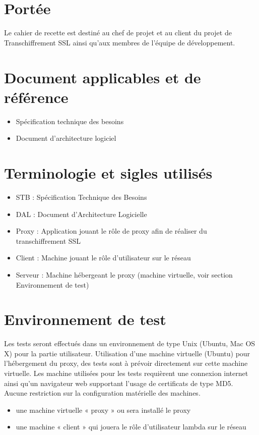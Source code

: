 \documentclass[a4paper,11pt,french]{article}
\begin{document}
\section{Portée}
Le cahier de recette est destiné au chef de projet et au client du projet de
Transchiffrement SSL ainsi qu’aux membres de l’équipe de développement.


\section{Document applicables et de référence}

\begin{itemize}
  \item Spécification technique des besoins
  \item Document d'architecture logiciel
\end{itemize}

\section{Terminologie et sigles utilisés}

\begin{itemize}
  \item STB : Spécification Technique des Besoins
  \item DAL : Document d’Architecture Logicielle
  \item Proxy : Application jouant le rôle de proxy afin de réaliser du transchiffrement SSL
  \item Client : Machine jouant le rôle d'utilisateur sur le réseau
  \item Serveur : Machine hébergeant le proxy (machine virtuelle, voir section Environnement de test)
\end{itemize}

\section{Environnement de test}
Les tests seront effectués dans un environnement de type Unix (Ubuntu, Mac OS 
X) pour la partie utilisateur. Utilisation d'une machine virtuelle (Ubuntu) pour l'hébergement du 
proxy, des tests sont à prévoir directement sur cette machine virtuelle. Les 
machine utilisées pour les tests requièrent une connexion internet ainsi qu'un
navigateur web supportant l'usage de certificats de type MD5. Aucune restriction 
sur la configuration matérielle des machines.
\begin{itemize}
\item une machine virtuelle « proxy » ou sera installé le proxy 
\item une machine « client » qui jouera le rôle d'utilisateur lambda sur le réseau
\end{itemize}
\end{document}

